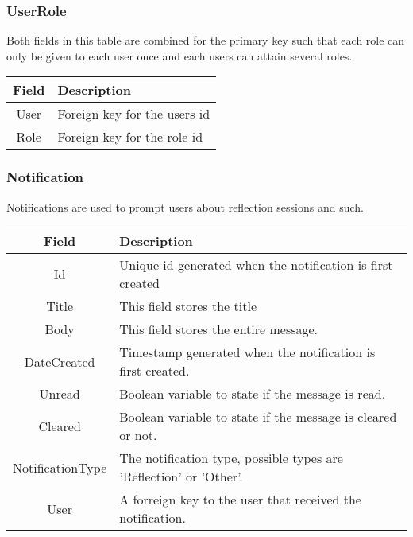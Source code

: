 \subsubsection*{UserRole}
Both fields in this table are combined for the primary key such that each role can only be given to each user once and each users can attain several roles. \\

\vspace{0.5cm}
\begin{tabularx}{\linewidth}{| c | X |}
    \hline
    \rowcolor[gray]{0.8}
    \textbf{Field} & \textbf{Description} \\
    \hline
    User & Foreign key for the users id \\ \hline
    Role & Foreign key for the role id \\
    \hline
\end{tabularx}
\vspace{0.5cm}

\subsubsection*{Notification}
Notifications are used to prompt users about reflection sessions and such. \\

\vspace{0.5cm}
\begin{tabularx}{\linewidth}{| c | X |}
    \hline
    \rowcolor[gray]{0.8}
    \textbf{Field} & \textbf{Description} \\
    \hline
    Id & Unique id generated when the notification is first created\\ \hline
    Title & This field stores the title\\ \hline
   	Body & This field stores the entire message.\\ \hline
    DateCreated & Timestamp generated when the notification is first created.\\ \hline
    Unread & Boolean variable to state if the message is read.\\ \hline
    Cleared & Boolean variable to state if the message is cleared or not.\\ \hline
    NotificationType & The notification type, possible types are 'Reflection' or 'Other'.\\ \hline
    User & A forreign key to the user that received the notification.\\ 
    \hline
\end{tabularx}
\vspace{0.5cm}

